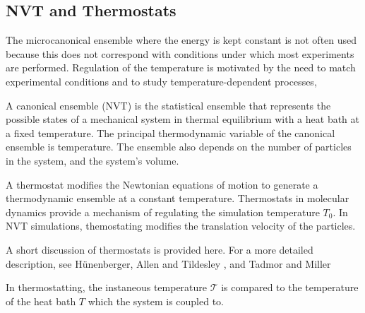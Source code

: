 \subsection{NVT and Thermostats}
\label{sec:nvt_ensemble}
The microcanonical ensemble where the energy is kept constant is not often used because this does not correspond with conditions under which most experiments are performed.  Regulation of the temperature is motivated by the need to match experimental conditions and to study temperature-dependent processes,

A canonical ensemble (NVT) is the statistical ensemble that represents the possible states of a mechanical system in thermal equilibrium with a heat bath at a fixed temperature.  The principal thermodynamic variable of the canonical ensemble is temperature.  The ensemble also depends on the number of particles in the system, and the system's volume.

A thermostat modifies the Newtonian equations of motion to generate a thermodynamic ensemble at a constant temperature.  Thermostats in molecular dynamics provide a mechanism of regulating the simulation temperature $T_0$.  In NVT simulations, themostating modifies the translation velocity of the particles.

A short discussion of thermostats is provided here.  For a more detailed description, see H\"{u}nenberger\cite{hunenberger2005_thermostat}, Allen and Tildesley \cite{allen1987_md}, and Tadmor and Miller \cite{tadmor2011_md}

In thermostatting, the instaneous temperature $\mathcal{T}$ is compared to the temperature of the heat bath $T$ which the system is coupled to.

